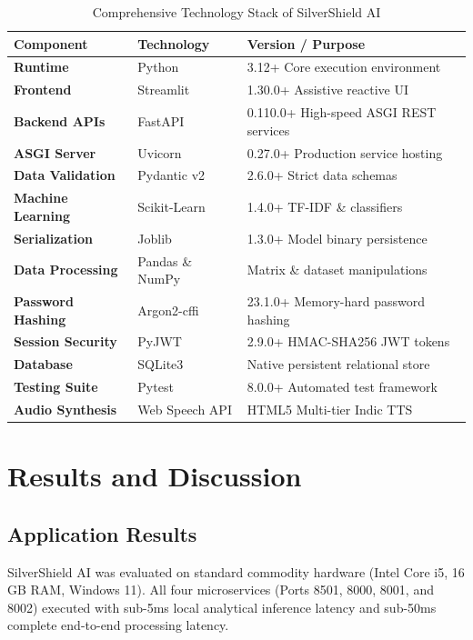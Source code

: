 \documentclass[conference]{IEEEtran}
\begin{document}
\begin{table}[!t]
\centering
\caption{Comprehensive Technology Stack of SilverShield AI}
\label{tab:tech_stack}
\begin{tabular}{|l|l|l|}
\hline
\textbf{Component} & \textbf{Technology} & \textbf{Version / Purpose} \\
\hline
\textbf{Runtime} & Python & 3.12+ Core execution environment \\
\textbf{Frontend} & Streamlit & 1.30.0+ Assistive reactive UI \\
\textbf{Backend APIs} & FastAPI & 0.110.0+ High-speed ASGI REST services \\
\textbf{ASGI Server} & Uvicorn & 0.27.0+ Production service hosting \\
\textbf{Data Validation} & Pydantic v2 & 2.6.0+ Strict data schemas \\
\textbf{Machine Learning} & Scikit-Learn & 1.4.0+ TF-IDF \& classifiers \\
\textbf{Serialization} & Joblib & 1.3.0+ Model binary persistence \\
\textbf{Data Processing} & Pandas \& NumPy & Matrix \& dataset manipulations \\
\textbf{Password Hashing} & Argon2-cffi & 23.1.0+ Memory-hard password hashing \\
\textbf{Session Security} & PyJWT & 2.9.0+ HMAC-SHA256 JWT tokens \\
\textbf{Database} & SQLite3 & Native persistent relational store \\
\textbf{Testing Suite} & Pytest & 8.0.0+ Automated test framework \\
\textbf{Audio Synthesis} & Web Speech API & HTML5 Multi-tier Indic TTS \\
\hline
\end{tabular}
\end{table}

\section{Results and Discussion}

\subsection{Application Results}
SilverShield AI was evaluated on standard commodity hardware (Intel Core i5, 16 GB RAM, Windows 11). All four microservices (Ports 8501, 8000, 8001, and 8002) executed with sub-5ms local analytical inference latency and sub-50ms complete end-to-end processing latency.
\end{document}

